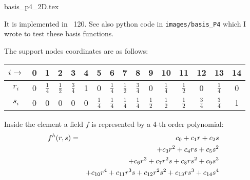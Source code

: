 \begin{flushright} {\tiny {\color{gray} basis\_p4\_2D.tex}} \end{flushright}

It is implemented in \stone~120.
See also python code in {\tt images/basis\_P4} which I wrote to test these basis functions.



The support nodes coordinates are as follows:

\begin{center}
\begin{tabular}{cccccccccccccccc}
\hline
$i\rightarrow$& 0& 1 &2 &3 &4 &5 &6 &7 &8 &9 &10 &11 &12 &13 &14  \\
\hline\hline
$r_i$&0&$\frac14$ & $\frac12$ & $\frac34$ & 1 &0 &$\frac14$&$\frac12$&
$\frac34$&0&$\frac14$&$\frac12$&0&$\frac14$&0    \\
$s_i$&0&0&0&0&0&$\frac14$&$\frac14$&$\frac14$&$\frac14$
&$\frac12$&$\frac12$&$\frac12$
&$\frac34$&$\frac34$&1\\
\hline
\end{tabular}
\end{center}

Inside the element a field $f$ is represented by a 4-th order polynomial:
\begin{eqnarray}
f^h(r,s)
&=&c_0 + c_1 r+c_2 s \nonumber\\
&&+ c_3 r^2 + c_4 rs + c_5 s^2 \nonumber\\
&&+c_6r^3 + c_7 r^2s + c_8 rs^2 + c_9 s^3 \nonumber\\
&&
+ c_{10} r^4 
+ c_{11} r^3s 
+ c_{12} r^2s^2
+ c_{13} rs^3
+c_{14} s^4
\end{eqnarray}

